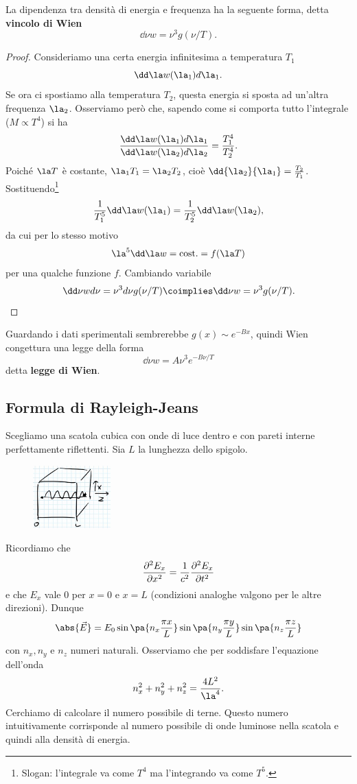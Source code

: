 \begin{proposition}\label{VincoloWien}
La dipendenza tra densit\`a di energia e frequenza ha la seguente forma, detta \textbf{vincolo di Wien}
\[\dd \nu w=\nu^3 g(\nu/T).\]
\end{proposition}
\begin{proof}
Consideriamo una certa energia infinitesima a temperatura $T_1$
\[\dd \la w(\la_1)d\la_1.\]
Se ora ci spostiamo alla temperatura $T_2$, questa energia si sposta ad un'altra frequenza $\la_2$. Osserviamo per\`o che, sapendo come si comporta tutto l'integrale ($M\propto T^4$) si ha
\[\frac{\dd \la w(\la_1)d\la_1}{\dd \la w(\la_2)d\la_2}=\frac{T^4_1}{T^4_2}.\]
Poich\'e $\la T$ \`e costante, $\la_1T_1=\la_2T_2$, cio\`e $\dd{\la_2}{\la_1}=\frac{T_2}{T_1}$. Sostituendo\footnote{Slogan: l'integrale va come $T^4$ ma l'integrando va come $T^5$.}
\[\frac1{T_1^5}\dd \la w(\la_1)=\frac1{T_2^5}\dd \la w(\la_2),\]
da cui per lo stesso motivo
\[\la^5\dd \la w=\text{cost.}=f(\la T)\]
per una qualche funzione $f$. Cambiando variabile
\[\dd \nu wd\nu=\nu^3d\nu g(\nu/T)\coimplies \dd \nu w=\nu^3 g(\nu/T).\]
\end{proof}

\noindent
Guardando i dati sperimentali sembrerebbe $g(x)\sim e^{-Bx}$, quindi Wien congettura una legge della forma
\[\dd \nu w=A\nu^3e^{-B\nu/T}\]
detta \textbf{legge di Wien}.




\subsection{Formula di Rayleigh-Jeans}
Scegliamo una scatola cubica con onde di luce dentro e con pareti interne perfettamente riflettenti. Sia $L$ la lunghezza dello spigolo.

\begin{figure}[!htb]
    \centering
    \includegraphics[width=3cm]{images/raggio_dentro_scatola.png}
\end{figure}


\noindent
Ricordiamo che
\[\pps[2]x{E_x}=\frac1{c^2}\pps[2]t{E_x}\]
e che $E_x$ vale $0$ per $x=0$ e $x=L$ (condizioni analoghe valgono per le altre direzioni). Dunque
\[\abs{\vec E}=E_0\sin\pa{n_x\frac{\pi x}L}\sin\pa{n_y\frac{\pi y}L}\sin\pa{n_z\frac{\pi z}L}\]
con $n_x,n_y$ e $n_z$ numeri naturali. Osserviamo che per soddisfare l'equazione dell'onda
\[n_x^2+n_y^2+n_z^2=\frac{4L^2}{\la^4}.\]
Cerchiamo di calcolare il numero possibile di terne. Questo numero intuitivamente corrisponde al numero possibile di onde luminose nella scatola e quindi alla densit\`a di energia.

